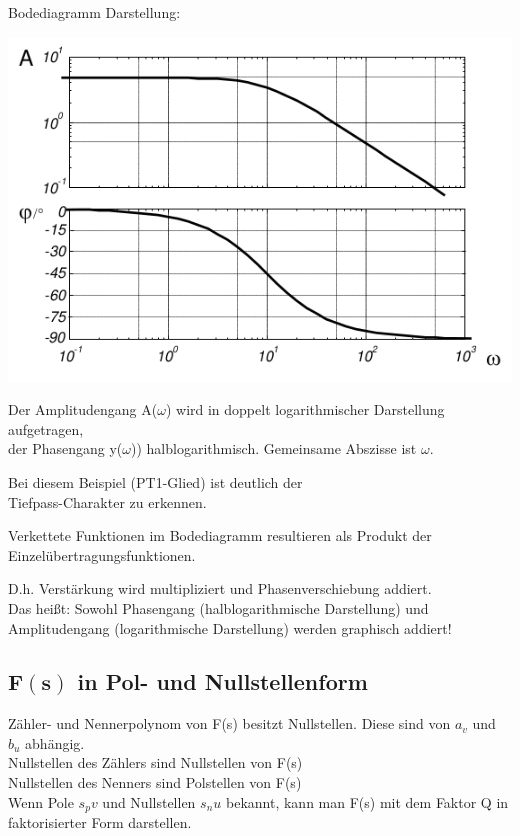 \documentclass[10pt,a4paper]{article}
\begin{document}
\newpage
Bodediagramm Darstellung:
\begin{center}
	\includegraphics[width=0.96\columnwidth]{Figures/Bodediagramm.png}
\end{center}
\begin{mdframed}[style=exercise]
	Der Amplitudengang A($\omega$) wird in doppelt logarithmischer Darstellung
	aufgetragen,\\ der Phasengang y($\omega$)) halblogarithmisch. Gemeinsame
	Abszisse ist $\omega$.

	Bei diesem Beispiel (PT1-Glied) ist deutlich der\\ Tiefpass-Charakter zu
	erkennen.

	Verkettete Funktionen im Bodediagramm resultieren als Produkt der
	Einzelübertragungsfunktionen.

	D.h. Verstärkung wird multipliziert und Phasenverschiebung addiert.\\ Das
	heißt: Sowohl Phasengang (halblogarithmische Darstellung) und Amplitudengang
	(logarithmische Darstellung) werden graphisch addiert!
\end{mdframed}

\subsection{$\mathbf{F(s)}$ in Pol- und Nullstellenform}
\begin{mdframed}[style=exercise]
	Zähler- und Nennerpolynom von F(s) besitzt Nullstellen. Diese sind von
	$a_v$ und $b_u$ abhängig.\\
	Nullstellen des Zählers sind Nullstellen von F(s)\\
	Nullstellen des Nenners sind Polstellen von F(s)\\
	Wenn Pole $s_pv$ und Nullstellen $s_nu$ bekannt, kann man F(s) mit dem
	Faktor Q in faktorisierter Form darstellen.
\end{mdframed}
\end{document}
